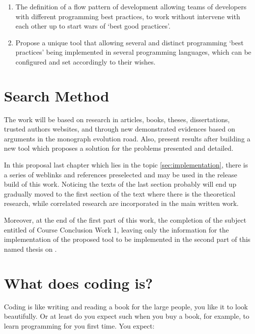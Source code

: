 \begin{englishtext}
\begin{enumerate}
        \item The definition of a flow pattern of development allowing teams of
        developers with different programming best practices, to work without
        intervene with each other up to start wars of `best good practices'.

        \item Propose a unique tool that allowing several and distinct
        programming `best practices' being implemented in several programming
        languages, which can be configured and set accordingly to their wishes.
    \end{enumerate}



    \section{Search Method}

    The work will be based on research in articles, books, theses,
    dissertations, trusted authors websites, and through new demonstrated
    evidences based on arguments in the monograph evolution road. Also, present
    results after building a new tool which proposes a solution for the problems
    presented and detailed. \cite{aspectOriented}

    In this proposal last chapter which lies in the topic
    \autoref{sec:implementation}, there is a series of weblinks and references
    preselected and may be used in the release build of this work. Noticing the
    texts of the last section probably will end up gradually moved to the first
    section of the text where there is the theoretical research, while
    correlated research are incorporated in the main written work.
    \cite{aspectOrientationReview}

    Moreover, at the end of the first part of this work, the completion of the
    subject entitled of Course Conclusion Work 1, leaving only the information
    for the implementation of the proposed tool to be implemented in the second
    part of this named thesis on .



    \section{What does coding is?}

    Coding is like writing and reading a book for the large people, you like it
    to look beautifully. Or at least do you expect such when you buy a book, for
    example, to learn programming for you first time. You expect: %


\end{englishtext}
